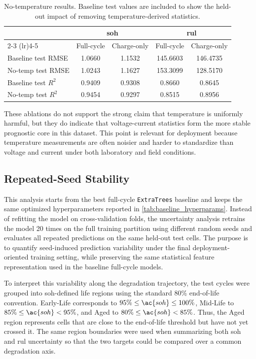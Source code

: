 \begin{table}[H]
    \centering
    \caption{No-temperature results. Baseline test values are included to show the held-out impact of removing temperature-derived statistics.}
    \label{tab:no_temperature_summary_transposed}
    \begin{tabular}{lcccc}
    \toprule
     & \multicolumn{2}{c}{\ac{soh}} & \multicolumn{2}{c}{\ac{rul}} \\
    \cmidrule(lr){2-3} \cmidrule(lr){4-5}
     & Full-cycle & Charge-only & Full-cycle & Charge-only \\
    \midrule
    Baseline test RMSE & 1.0660 & 1.1532 & 145.6603 & 146.4735 \\
    No-temp test RMSE & 1.0243 & 1.1627 & 153.3099 & 128.5170 \\
    Baseline test $R^2$ & 0.9409 & 0.9308 & 0.8660 & 0.8645 \\
    No-temp test $R^2$ & 0.9454 & 0.9297 & 0.8515 & 0.8956 \\
    \bottomrule
    \end{tabular}
\end{table}

These ablations do not support the strong claim that temperature is uniformly harmful, but they do indicate that voltage-current statistics form the more stable prognostic core in this dataset. This point is relevant for deployment because temperature measurements are often noisier and harder to standardize than voltage and current under both laboratory and field conditions.

\subsection{Repeated-Seed Stability}
\label{sec:results_seed_stability}

This analysis starts from the best full-cycle \texttt{ExtraTrees} baseline and keeps the same optimized hyperparameters reported in \cref{tab:baseline_hyperparams}. Instead of refitting the model on cross-validation folds, the uncertainty analysis retrains the model 20 times on the full training partition using different random seeds and evaluates all repeated predictions on the same held-out test cells. The purpose is to quantify seed-induced prediction variability under the final deployment-oriented training setting, while preserving the same statistical feature representation used in the baseline full-cycle models.

To interpret this variability along the degradation trajectory, the test cycles were grouped into \ac{soh}-defined life regions using the standard 80\% end-of-life convention. Early-Life corresponds to \(95\%\leq \ac{soh}\leq 100\%\), Mid-Life to \(85\%\leq \ac{soh}<95\%\), and Aged to \(80\%\leq \ac{soh}<85\%\). Thus, the Aged region represents cells that are close to the end-of-life threshold but have not yet crossed it. The same region boundaries were used when summarizing both \ac{soh} and \ac{rul} uncertainty so that the two targets could be compared over a common degradation axis.

